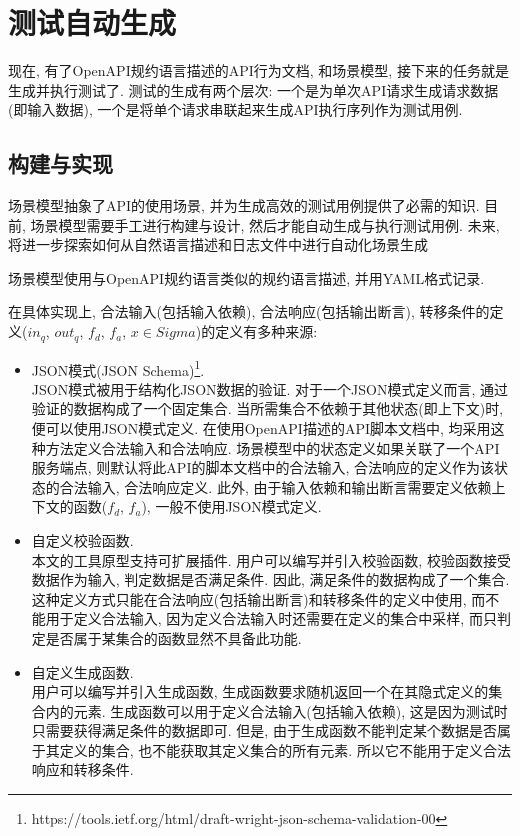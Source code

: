 \chapter{测试自动生成}

    现在, 有了OpenAPI规约语言描述的API行为文档, 和场景模型, 接下来的任务就是生成并执行测试了. 测试的生成有两个层次: 一个是为单次API请求生成请求数据(即输入数据), 一个是将单个请求串联起来生成API执行序列作为测试用例.
    
    \section{构建与实现}
        场景模型抽象了API的使用场景, 并为生成高效的测试用例提供了必需的知识. 目前, 场景模型需要手工进行构建与设计, 然后才能自动生成与执行测试用例. 未来, 将进一步探索如何从自然语言描述和日志文件中进行自动化场景生成
        
        场景模型使用与OpenAPI规约语言类似的规约语言描述, 并用YAML格式记录.
        
        在具体实现上, 合法输入(包括输入依赖), 合法响应(包括输出断言), 转移条件的定义($in_q$, $out_q$, $f_d$, $f_a$, $x \in Sigma$)的定义有多种来源:
        
        \label{sec:set_define}
        \begin{itemize}
            \item JSON模式(JSON Schema)\footnote{https://tools.ietf.org/html/draft-wright-json-schema-validation-00}.\\
            JSON模式被用于结构化JSON数据的验证. 对于一个JSON模式定义而言, 通过验证的数据构成了一个固定集合. 当所需集合不依赖于其他状态(即上下文)时, 便可以使用JSON模式定义. 在使用OpenAPI描述的API脚本文档中, 均采用这种方法定义合法输入和合法响应. 场景模型中的状态定义如果关联了一个API服务端点, 则默认将此API的脚本文档中的合法输入, 合法响应的定义作为该状态的合法输入, 合法响应定义. 此外, 由于输入依赖和输出断言需要定义依赖上下文的函数($f_d$, $f_a$), 一般不使用JSON模式定义. 
            
            \item 自定义校验函数.\\
            本文的工具原型支持可扩展插件. 用户可以编写并引入校验函数, 校验函数接受数据作为输入, 判定数据是否满足条件. 因此, 满足条件的数据构成了一个集合. 这种定义方式只能在合法响应(包括输出断言)和转移条件的定义中使用, 而不能用于定义合法输入, 因为定义合法输入时还需要在定义的集合中采样, 而只判定是否属于某集合的函数显然不具备此功能.
            
            \item 自定义生成函数.\\
            用户可以编写并引入生成函数, 生成函数要求随机返回一个在其隐式定义的集合内的元素. 生成函数可以用于定义合法输入(包括输入依赖), 这是因为测试时只需要获得满足条件的数据即可. 但是, 由于生成函数不能判定某个数据是否属于其定义的集合, 也不能获取其定义集合的所有元素. 所以它不能用于定义合法响应和转移条件.
        \end{itemize}
        
